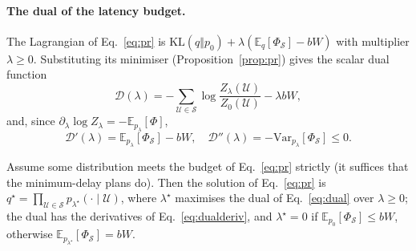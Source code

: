\paragraph{The dual of the latency budget.} The Lagrangian of Eq.~\eqref{eq:pr} is
$\mathrm{KL}(q\Vert p_0)+\lambda(\mathbb{E}_q[\Phi_\mathcal{S}]-bW)$ with multiplier $\lambda\ge0$. Substituting its
minimiser (Proposition~\ref{prop:pr}) gives the scalar dual function
\begin{equation}
\mathcal{D}(\lambda)=-\sum_{\mathcal{U}\in\mathcal{S}}\log\frac{Z_\lambda(\mathcal{U})}{Z_0(\mathcal{U})}-\lambda bW,
\label{eq:dual}
\end{equation}
and, since $\partial_\lambda\log Z_\lambda=-\mathbb{E}_{p_\lambda}[\Phi]$,
\begin{equation}
\mathcal{D}'(\lambda)=\mathbb{E}_{p_\lambda}[\Phi_\mathcal{S}]-bW,\quad
\mathcal{D}''(\lambda)=-\mathrm{Var}_{p_\lambda}[\Phi_\mathcal{S}]\le0.
\label{eq:dualderiv}
\end{equation}

\begin{proposition}
\label{prop:pr}
Assume some distribution meets the budget of Eq.~\eqref{eq:pr} strictly (it suffices that the minimum-delay plans do).
Then the solution of Eq.~\eqref{eq:pr} is $q^\star=\prod_{\mathcal{U}\in\mathcal{S}}p_{\lambda^\star}(\cdot\mid\mathcal{U})$,
where $\lambda^\star$ maximises the dual of Eq.~\eqref{eq:dual} over $\lambda\ge0$; the dual has the derivatives of
Eq.~\eqref{eq:dualderiv}, and $\lambda^\star=0$ if $\mathbb{E}_{p_0}[\Phi_\mathcal{S}]\le bW$, otherwise
$\mathbb{E}_{p_{\lambda^\star}}[\Phi_\mathcal{S}]=bW$.
\end{proposition}

